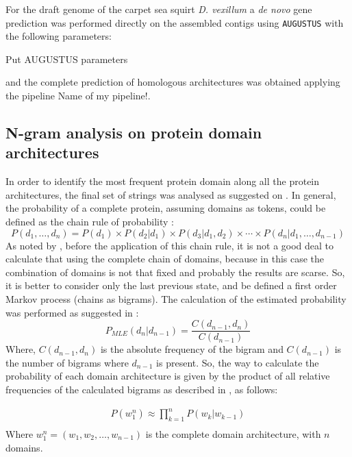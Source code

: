 \documentclass[11pt]{article}
\newcommand{\TODO}[1]{\begingroup\color{red}#1\endgroup}
\begin{document}
For the draft genome of the carpet sea squirt \textit{D. vexillum} 
\cite{velandia2016a} a \textit{de novo} gene prediction was performed 
directly on the assembled contigs using \texttt{AUGUSTUS} \cite{augustus} 
with the following parameters:

\TODO{Put AUGUSTUS parameters}

and the complete prediction of homologous architectures was obtained applying 
the pipeline \TODO{Name of my pipeline!}.

\subsection*{N-gram analysis on protein domain architectures}
In order to identify the most frequent protein domain along all the protein 
architectures, the final set of strings was analysed as suggested on \cite{Yu:2019}.
In general, the probability of a complete protein, assuming domains as tokens, could be
defined as the chain rule of probability \cite{Jurafsky:2018Book}:
\begin{equation}\label{eqProbAll}
P(d_1,\ldots,d_n) = P(d_1) \times P(d_2|d_1) \times P(d_3|d_1,d_2) \times \cdots \times P(d_n|d_1, \ldots , d_{n-1})
\end{equation}
As noted by \cite{Yu:2019}, before the application of this chain rule, 
it is not a good deal to calculate that using the complete chain of domains, because in this case
the combination of domains is not that fixed and probably the results are scarse. So, 
it is better to consider only the last previous state, and be defined a first order Markov 
process (chains as bigrams). The calculation of the estimated probability was 
performed as suggested in \cite{Yu:2019}:
\begin{equation}\label{eqEST}
P_{MLE} (d_n|d_{n-1}) = \frac{C (d_{n-1},d_n)}{C (d_{n-1})}
\end{equation}
Where, $C(d_{n-1},d_n)$ is the absolute frequency of the bigram and $C(d_{n-1})$ is the number
of bigrams where $d_{n-1}$ is present. So, the way to calculate the probability of 
each domain architecture is given by the product of all relative frequencies of the 
calculated bigrams as described in \cite{Jurafsky:2018Book}, as follows:

\begin{equation}\label{eqFinalProd}
  \begin{split}
    P(w_1^n) \approx \prod_{k=1}^n P(w_k|w_{k-1}) \\ 
  \end{split}
\end{equation}
Where $w_1^n = (w_1, w_2, \dots, w_{n-1})$ is the complete domain architecture, with $n$ domains.
\end{document}
